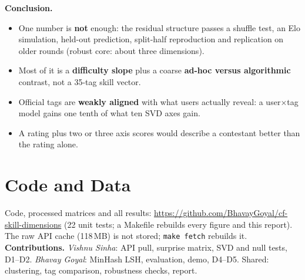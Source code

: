 \documentclass[conference]{IEEEtran}
\newcommand{\repourl}{https://github.com/BhavayGoyal/cf-skill-dimensions}
\begin{document}
\textbf{Conclusion.}
\begin{itemize}
\item One number is \textbf{not} enough: the residual structure passes a shuffle test, an Elo simulation, held-out prediction, split-half reproduction and replication on older rounds (robust core: about three dimensions).
\item Most of it is a \textbf{difficulty slope} plus a coarse \textbf{ad-hoc versus algorithmic} contrast, not a 35-tag skill vector.
\item Official tags are \textbf{weakly aligned} with what users actually reveal: a user$\times$tag model gains one tenth of what ten SVD axes gain.
\item A rating plus two or three axis scores would describe a contestant better than the rating alone.
\end{itemize}

\section*{Code and Data}
Code, processed matrices and all results: \url{\repourl} (22 unit tests; a Makefile rebuilds every figure and this report). The raw API cache (118\,MB) is not stored; \texttt{make fetch} rebuilds it. \textbf{Contributions.} \emph{Vishnu Sinha}: API pull, surprise matrix, SVD and null tests, D1--D2. \emph{Bhavay Goyal}: MinHash LSH, evaluation, demo, D4--D5. Shared: clustering, tag comparison, robustness checks, report.
\end{document}
